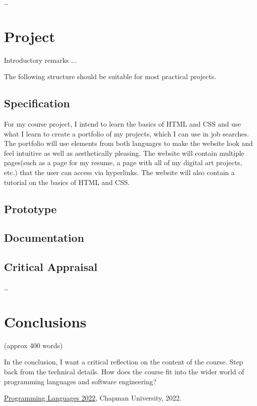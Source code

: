 \documentclass{article}
\theoremstyle{theorem}
\theoremstyle{definition}
\theoremstyle{remark}
\begin{document}
\ldots

\section{Project}

Introductory remarks ...

The following structure should be suitable for most practical projects. 

\subsection{Specification}

For my course project, I intend to learn the basics of HTML and CSS and use what I learn to create a portfolio of my projects, which I can use in job searches. The portfolio will use elements from both languages to make the website look and feel intuitive as well as aesthetically pleasing. The website will contain multiple pages(such as a page for my resume, a page with all of my digital art projects, etc.) that the user can access via hyperlinks. The website will also contain a tutorial on the basics of HTML and CSS.

\subsection{Prototype}
\subsection{Documentation}
\subsection{Critical Appraisal}

\ldots

\section{Conclusions}\label{conclusions}

(approx 400 words)

In the conclusion, I want a critical reflection on the content of the course. Step back from the technical details. How does the course fit into the wider world of programming languages and software engineering?

\begin{thebibliography}{99}
 \href{https://github.com/alexhkurz/programming-languages-2022/blob/main/README.md}{Programming Languages 2022}, Chapman University, 2022.
\end{thebibliography}
\end{document}
